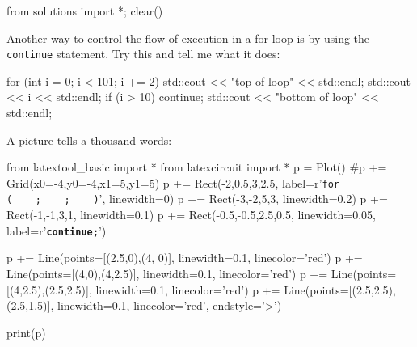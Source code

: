 \begin{python0}
from solutions import *; clear()
\end{python0}

Another way to control the flow of execution in a for-loop is by using
the \texttt{continue} statement. Try this and tell me what it does:
\begin{console}
for (int i = 0; i < 101; i += 2)
{   
    std::cout << "top of loop" << std::endl;
    std::cout << i << std::endl;
    if (i > 10) continue;
    std::cout << "bottom of loop" << std::endl;
}
\end{console}
A picture tells a thousand words:
\begin{python}
from latextool_basic import *
from latexcircuit import *
p = Plot()
#p += Grid(x0=-4,y0=-4,x1=5,y1=5)
p += Rect(-2,0.5,3,2.5, label=r'\large{\texttt{for  (\ \ \ \ ;\ \ \ \ ;\ \ \ \ )}}', linewidth=0)
p += Rect(-3,-2,5,3, linewidth=0.2)
p += Rect(-1,-1,3,1, linewidth=0.1)
p += Rect(-0.5,-0.5,2.5,0.5, linewidth=0.05, label=r'\texttt{\textbf{continue;}}')


p += Line(points=[(2.5,0),(4, 0)], linewidth=0.1, linecolor='red')
p += Line(points=[(4,0),(4,2.5)], linewidth=0.1, linecolor='red')
p += Line(points=[(4,2.5),(2.5,2.5)], linewidth=0.1, linecolor='red')
p += Line(points=[(2.5,2.5),(2.5,1.5)], linewidth=0.1, linecolor='red', endstyle='>')

print(p)
\end{python}


